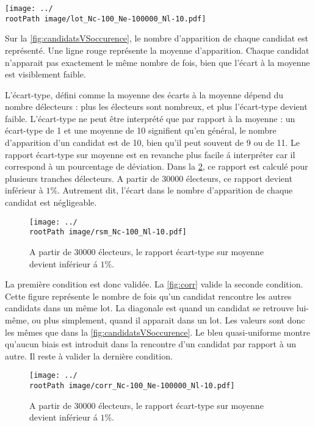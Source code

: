 \documentclass[conference]{IEEEtran}
\newcommand*{\rootPath}{../}
\begin{document}
\begin{figure*}[!ht]
  \centering
  \texttt{[image: ../\\rootPath image/lot\_Nc-100\_Ne-100000\_Nl-10.pdf]}
  \caption{Avec 100000 \'electeurs et 100 candidats, chaque candidat apparait autant de fois que les autres candidats dans les lots}
  \label{fig:candidatsVSoccurence}
\end{figure*}

Sur la \cref{fig:candidatsVSoccurence}, le nombre d'apparition de chaque candidat est repr\'esent\'e. Une ligne rouge repr\'esente la moyenne d'apparition. Chaque candidat n'apparait pas exactement le m\^eme nombre de fois, bien que l'\'ecart \`a la moyenne est visiblement faible. 

L'\'ecart-type, d\'efini comme la moyenne des \'ecarts \`a la moyenne d\'epend du nombre d\'electeurs : plus les \'electeurs sont nombreux, et plus l'\'ecart-type devient faible. L'\'ecart-type ne peut \^etre interpr\'et\'e que par rapport \`a la moyenne : un \'ecart-type de 1 et une moyenne de 10 signifient qu'en g\'en\'eral, le nombre d'apparition d'un candidat est de 10, bien qu'il peut souvent de 9 ou de 11. Le rapport \'ecart-type sur moyenne est en revanche plus facile \'a interpr\'eter car il correspond \`a un pourcentage de d\'eviation. Dans la \cref{fig:rem}, ce rapport est calcul\'e pour plusieurs tranches d\'electeurs. A partir de 30000 \'electeurs, ce rapport devient inf\'erieur \`a $1\%$. Autrement dit, l'\'ecart dans le nombre d'apparition de chaque candidat est n\'egligeable.


\begin{figure}[!ht]
  \centering
  \texttt{[image: ../\\rootPath image/rsm\_Nc-100\_Nl-10.pdf]}
  \caption{A partir de 30000 \'electeurs, le rapport \'ecart-type sur moyenne devient inf\'erieur \'a $1\%$.}
  \label{fig:rem}
\end{figure}

La premi\`ere condition est donc valid\'ee. La \cref{fig:corr} valide la seconde condition. Cette figure repr\'esente le nombre de fois qu'un candidat rencontre les autres candidats dans un m\^eme lot. La diagonale est quand un candidat se retrouve lui-m\^eme, ou plus simplement, quand il apparait dans un lot. Les valeurs sont donc les m\^emes que dans la \cref{fig:candidatsVSoccurence}. Le bleu quasi-uniforme montre qu'aucun biais est introduit dans la rencontre d'un candidat par rapport \`a un autre. Il reste \`a valider la derni\`ere condition.


\begin{figure}[!ht]
  \centering
  \texttt{[image: ../\\rootPath image/corr\_Nc-100\_Ne-100000\_Nl-10.pdf]}
  \caption{A partir de 30000 \'electeurs, le rapport \'ecart-type sur moyenne devient inf\'erieur \'a $1\%$.}
  \label{fig:rem}
\end{figure}
\end{document}
